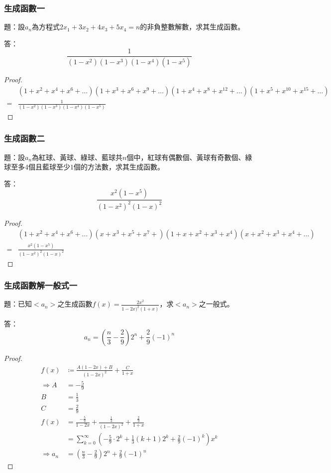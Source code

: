 \documentclass[a4paper,12pt]{article}
\begin{document}
\subsubsection{生成函數一}
題：設$a_n$為方程式$2x_1+3x_2+4x_3+5x_4=n$的非負整數解數，求其生成函數。

答：
\[\frac{1}{(1-x^2)(1-x^3)(1-x^4)(1-x^5)}\]
\begin{proof}
\[
\begin{aligned}
& (1+x^2+x^4+x^6+\ldots)(1+x^3+x^6+x^9+\ldots)(1+x^4+x^8+x^{12}+\ldots)(1+x^5+x^{10}+x^{15}+\ldots) \\
=& \frac{1}{(1-x^2)(1-x^3)(1-x^4)(1-x^5)}
\end{aligned}
\]
\end{proof}
\subsubsection{生成函數二}
題：設$a_n$為紅球、黃球、綠球、藍球共$n$個中，紅球有偶數個、黃球有奇數個、綠球至多$4$個且藍球至少$1$個的方法數，求其生成函數。

答：
\[\frac{x^2(1-x^5)}{(1-x^2)^2(1-x)^2}\]
\begin{proof}
\[
\begin{aligned}
& (1+x^2+x^4+x^6+\ldots)(x+x^3+x^5+x^7+)(1+x+x^2+x^3+x^4)(x+x^2+x^3+x^4+\ldots) \\
=& \frac{x^2(1-x^5)}{(1-x^2)^2(1-x)^2}
\end{aligned}
\]
\end{proof}
\subsubsection{生成函數解一般式一}
題：已知$<a_n>$之生成函數$f(x)=\frac{2x^2}{1-2x)^2(1+x)}$，求$<a_n>$之一般式。

答：
\[
a_n = \left(\frac{n}{3}-\frac{2}{9}\right)2^n+\frac{2}{9}(-1)^n
\]
\begin{proof}
\[
\begin{aligned}
f(x) &\coloneq \frac{A(1-2x)+B}{(1-2x)^2}+\frac{C}{1+x} \\
\Rightarrow A &= -\frac{5}{9} \\
B &= \frac{1}{3} \\
C &= \frac{2}{9} \\
f(x) &= \frac{-\frac{5}{9}}{1-2x}+\frac{\frac{1}{3}}{(1-2x)^2}+\frac{\frac{2}{9}}{1+x} \\
&= \sum_{k=0}^\infty \left(-\frac{5}{9}\cdot 2^k+\frac{1}{3}(k+1)2^k+\frac{2}{9}(-1)^k\right)x^k \\
\Rightarrow a_n &= \left(\frac{n}{3}-\frac{2}{9}\right)2^n+\frac{2}{9}(-1)^n
\end{aligned}
\]
\end{proof}
\end{document}
